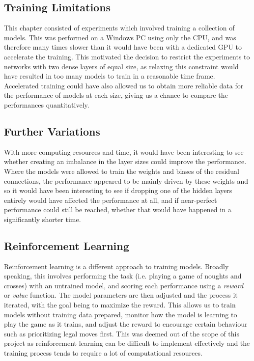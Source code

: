 \documentclass{somasmsc}
\begin{document}
\subsection{Training Limitations}

This chapter consisted of experiments which involved training a collection of models. This was performed on a Windows PC using only the CPU, and was therefore many times slower than it would have been with a dedicated GPU to accelerate the training. This motivated the decision to restrict the experiments to networks with two dense layers of equal size, as relaxing this constraint would have resulted in too many models to train in a reasonable time frame. Accelerated training could have also allowed us to obtain more reliable data for the performance of models at each size, giving us a chance to compare the performances quantitatively.

\subsection{Further Variations}

With more computing resources and time, it would have been interesting to see whether creating an imbalance in the layer sizes could improve the performance. Where the models were allowed to train the weights and biases of the residual connections, the performance appeared to be mainly driven by these weights and so it would have been interesting to see if dropping one of the hidden layers entirely would have affected the performance at all, and if near-perfect performance could still be reached, whether that would have happened in a significantly shorter time.

\subsection{Reinforcement Learning}

Reinforcement learning is a different approach to training models. Broadly speaking, this involves performing the task (i.e. playing a game of noughts and crosses) with an untrained model, and scoring each performance using a \textit{reward} or \textit{value} function. The model parameters are then adjusted and the process it iterated, with the goal being to maximize the reward. This allows us to train models without training data prepared, monitor how the model is learning to play the game as it trains, and adjust the reward to encourage certain behaviour such as prioritizing legal moves first. This was deemed out of the scope of this project as reinforcement learning can be difficult to implement effectively and the training process tends to require a lot of computational resources.
\end{document}
